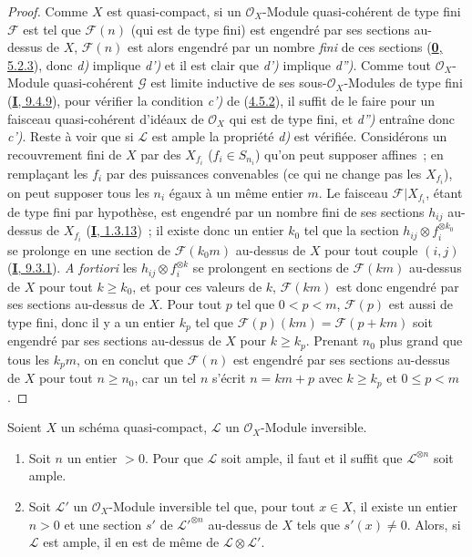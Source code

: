 \begin{proof}
Comme $X$ est quasi-compact, si un $\mathcal{O}_X$-Module quasi-cohérent de
type fini $\mathcal{F}$ est tel que $\mathcal{F}(n)$ (qui est de type fini)
est engendré par ses sections au-dessus de $X$, $\mathcal{F}(n)$ est alors
engendré par un nombre \emph{fini} de ces sections
(\hyperref[0.5.2.3-fr]{\textbf{0}, 5.2.3}), donc \emph{d)} implique \emph{d')} et il est clair que
\emph{d')} implique \emph{d'')}. Comme tout $\mathcal{O}_X$-Module quasi-cohérent
$\mathcal{G}$ est limite inductive de ses sous-$\mathcal{O}_X$-Modules de
type fini (\hyperref[I.9.4.9-fr]{\textbf{I}, 9.4.9}), pour vérifier la condition \emph{c')}
de (\hyperref[II.4.5.2-fr]{4.5.2}), il suffit de le faire pour un faisceau
quasi-cohérent d'idéaux de $\mathcal{O}_X$ qui est de type fini, et \emph{d'')}
entraîne donc \emph{c')}. Reste à voir que si $\mathcal{L}$ est ample la propriété
\emph{d)} est vérifiée. Considérons un recouvrement fini de $X$ par des
$X_{f_i}$ ($f_i\in S_{n_i}$) qu'on peut supposer affines~; en remplaçant les
$f_i$ par des puissances convenables (ce qui ne change pas les $X_{f_i}$),
on peut supposer tous les $n_i$ égaux à un même entier $m$. Le faisceau
$\mathcal{F}|X_{f_i}$, étant de type fini par hypothèse, est engendré par un
nombre fini de ses sections $h_{ij}$ au-dessus de $X_{f_i}$
(\hyperref[I.1.3.13-fr]{\textbf{I}, 1.3.13})~; il existe donc un entier $k_0$ tel que
la section $h_{ij}\otimes f_i^{\otimes k_0}$ se prolonge en une section de
$\mathcal{F}(k_0m)$ au-dessus de $X$ pour tout couple $(i,j)$
(\hyperref[I.9.3.1-fr]{\textbf{I}, 9.3.1}). \emph{A fortiori} les
$h_{ij}\otimes f_i^{\otimes k}$ se prolongent en sections de
$\mathcal{F}(km)$ au-dessus de $X$ pour tout $k\geq k_0$, et pour ces valeurs
de $k$, $\mathcal{F}(km)$ est donc engendré par ses sections au-dessus de
$X$. Pour tout $p$ tel que $0<p<m$, $\mathcal{F}(p)$ est aussi de type fini,
donc il y a un entier $k_p$ tel que
$\mathcal{F}(p)(km)=\mathcal{F}(p+km)$ soit engendré par ses sections
au-dessus de $X$ pour $k\geq k_p$. Prenant $n_0$ plus grand que tous les
$k_pm$, on en conclut que $\mathcal{F}(n)$ est engendré par ses sections
au-dessus de $X$ pour tout $n\geq n_0$, car un tel $n$ s'écrit $n=km+p$ avec
$k\geq k_p$ et $0\leq p<m$.
\end{proof}

\begin{proposition}[4.5.6]
\label{II.4.5.6-fr}
Soient $X$ un schéma quasi-compact, $\mathcal{L}$ un $\mathcal{O}_X$-Module
inversible.
\begin{enumerate}
  \item[\rm{(i)}] Soit $n$ un entier $>0$. Pour que $\mathcal{L}$ soit
  ample, il faut et il suffit que $\mathcal{L}^{\otimes n}$ soit ample.
  \item[\rm{(ii)}] Soit $\mathcal{L}'$ un $\mathcal{O}_X$-Module inversible
  tel que, pour tout $x\in X$, il existe un entier $n>0$
  et une section $s'$ de $\mathcal{L}'^{\otimes n}$ au-dessus de $X$ tels
  que $s'(x)\neq0$. Alors, si $\mathcal{L}$ est ample, il en est de même de
  $\mathcal{L}\otimes\mathcal{L}'$.
\end{enumerate}
\end{proposition}

